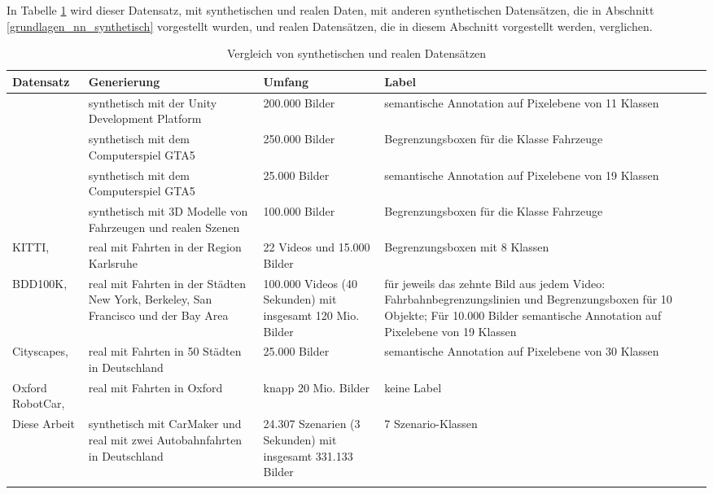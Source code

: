In Tabelle \ref{tab_datensaetze} wird dieser Datensatz, mit synthetischen und realen Daten, mit anderen synthetischen Datensätzen, die in Abschnitt \ref{grundlagen_nn_synthetisch} vorgestellt wurden, und realen Datensätzen, die in diesem Abschnitt vorgestellt werden, verglichen.

\begin{longtable}[c]{p{2cm} p{3.5cm} p{2.5cm} p{4cm}}
\textbf{Datensatz} & \textbf{Generierung} & \textbf{Umfang} & \textbf{Label} \\
\hline
\endhead

\cite{ros2016synthia} & synthetisch mit der Unity Development Platform & 200.000 Bilder & semantische Annotation auf Pixelebene von 11 Klassen  \\
\hline
\cite{johnson2017driving} & synthetisch mit dem Computerspiel GTA5 & 250.000 Bilder & Begrenzungsboxen für die Klasse Fahrzeuge \\
\hline
\cite{richter2016playing} & synthetisch mit dem Computerspiel GTA5 & 25.000 Bilder & semantische Annotation auf Pixelebene von 19 Klassen \\
\hline
\cite{tremblay2018training} & synthetisch mit 3D Modelle von Fahrzeugen und realen Szenen & 100.000 Bilder & Begrenzungsboxen für die Klasse Fahrzeuge \\
\hline
KITTI, \cite{geiger2013vision} & real mit Fahrten in der Region Karlsruhe & 22 Videos und 15.000 Bilder & Begrenzungsboxen mit 8 Klassen \\
\hline
BDD100K, \cite{yu2018bdd100k} & real mit Fahrten in der Städten New York, Berkeley, San Francisco und der Bay Area & 100.000 Videos (40 Sekunden) mit insgesamt 120 Mio. Bilder & für jeweils das zehnte Bild aus jedem Video: Fahrbahnbegrenzungslinien und Begrenzungsboxen für 10 Objekte; Für 10.000 Bilder semantische Annotation auf Pixelebene von 19 Klassen \\
\hline
Cityscapes, \cite{cordts2016cityscapes} & real mit Fahrten in 50 Städten in Deutschland & 25.000 Bilder & semantische Annotation auf Pixelebene von 30 Klassen \\
\hline
Oxford RobotCar, \cite{maddern20171} & real mit Fahrten in Oxford & knapp 20 Mio. Bilder & keine Label \\
\hline
Diese Arbeit & synthetisch mit CarMaker und real mit zwei Autobahnfahrten in Deutschland & 24.307 Szenarien (3 Sekunden) mit insgesamt 331.133 Bilder & 7 Szenario-Klassen \\

\hline
\caption{Vergleich von synthetischen und realen Datensätzen}
\label{tab_datensaetze}
\end{longtable}


